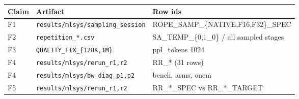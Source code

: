 \begin{tabular}{lll}
\toprule
Claim & Artifact & Row ids \\
\midrule
F1 & \texttt{results/mlsys/sampling\_session} & ROPE\_SAMP\_\{NATIVE,F16,F32\}\_SPEC \\
F2 & \texttt{repetition\_*.csv} & SA\_TEMP\_\{0,1\_0\} / all sampled stages \\
F3 & \texttt{QUALITY\_FIX\_\{128K,1M\}} & ppl\_tokens 1024 \\
F4 & \texttt{results/mlsys/rerun\_r1,r2} & RR\_* (31 rows) \\
F4 & \texttt{results/mlsys/bw\_diag\_p1,p2} & bench, arms, onem \\
F5 & \texttt{results/mlsys/rerun\_r1,r2} & RR\_*\_SPEC vs RR\_*\_TARGET \\
\bottomrule
\end{tabular}
